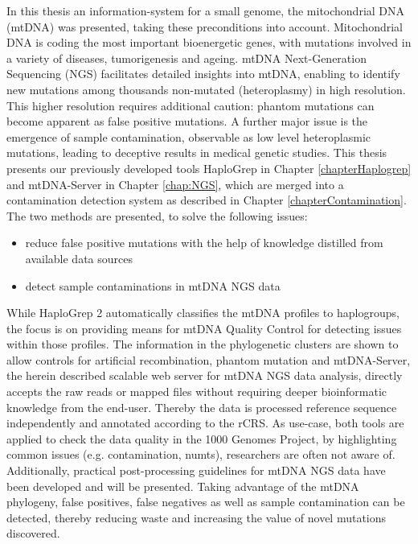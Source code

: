 In this thesis an information-system for a small genome, the mitochondrial DNA (mtDNA) was presented, taking these preconditions into account. Mitochondrial DNA is coding the most important bioenergetic genes, with mutations involved in a variety of diseases, tumorigenesis and ageing. mtDNA Next-Generation Sequencing (NGS) facilitates detailed insights into mtDNA, enabling to identify new mutations among thousands non-mutated (heteroplasmy) in high resolution. This higher resolution requires additional caution: phantom mutations can become apparent as false positive mutations. A further major issue is the emergence of sample contamination, observable as low level heteroplasmic mutations, leading to deceptive results in medical genetic studies.
This thesis presents our previously developed tools HaploGrep in Chapter \ref{chapterHaplogrep} and mtDNA-Server in Chapter \ref{chap:NGS}, which are merged into a contamination detection system as described in Chapter \ref{chapterContamination}. The two methods are presented, to solve the following issues:
\begin{itemize}
\item reduce false positive mutations with the help of knowledge distilled from available data sources  
\item detect sample contaminations in mtDNA NGS data
\end{itemize}
While HaploGrep 2 automatically classifies the mtDNA profiles to haplogroups, the focus is on providing means for mtDNA Quality Control for detecting issues within those profiles. The information in the phylogenetic clusters are shown to allow controls for artificial recombination, phantom mutation and 
mtDNA-Server, the herein described scalable web server for mtDNA NGS data analysis, directly accepts the raw reads or mapped files without requiring deeper bioinformatic knowledge from the end-user. Thereby the data is processed reference sequence independently and annotated according to the rCRS. 
As use-case, both tools are applied to check the data quality in the 1000 Genomes Project, by highlighting common issues (e.g. contamination, numts), researchers are often not aware of. Additionally, practical post-processing guidelines for mtDNA NGS data have been developed and will be presented. Taking advantage of the mtDNA phylogeny, false positives, false negatives as well as sample contamination can be detected, thereby reducing waste and increasing the value of novel mutations discovered.
